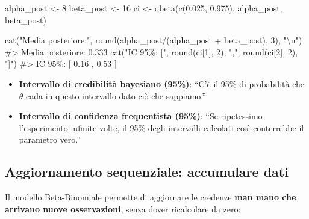 \documentclass[
  letterpaper,
  DIV=11,
  numbers=noendperiod,
  oneside]{scrreprt}
\newenvironment{Shaded}{\begin{snugshade}}{\end{snugshade}}
\newcommand{\CommentTok}[1]{\textcolor[rgb]{0.37,0.37,0.37}{#1}}
\newcommand{\DecValTok}[1]{\textcolor[rgb]{0.68,0.00,0.00}{#1}}
\newcommand{\FloatTok}[1]{\textcolor[rgb]{0.68,0.00,0.00}{#1}}
\newcommand{\FunctionTok}[1]{\textcolor[rgb]{0.28,0.35,0.67}{#1}}
\newcommand{\NormalTok}[1]{\textcolor[rgb]{0.00,0.23,0.31}{#1}}
\newcommand{\OtherTok}[1]{\textcolor[rgb]{0.00,0.23,0.31}{#1}}
\newcommand{\SpecialCharTok}[1]{\textcolor[rgb]{0.37,0.37,0.37}{#1}}
\newcommand{\StringTok}[1]{\textcolor[rgb]{0.13,0.47,0.30}{#1}}
\providecommand{\tightlist}{%
  \setlength{\itemsep}{0pt}\setlength{\parskip}{0pt}}
\theoremstyle{definition}
\theoremstyle{plain}
\theoremstyle{definition}
\theoremstyle{remark}
\begin{document}
\begin{Shaded}
\begin{Highlighting}[]
\NormalTok{alpha\_post }\OtherTok{\textless{}{-}} \DecValTok{8}
\NormalTok{beta\_post }\OtherTok{\textless{}{-}} \DecValTok{16}
\NormalTok{ci }\OtherTok{\textless{}{-}} \FunctionTok{qbeta}\NormalTok{(}\FunctionTok{c}\NormalTok{(}\FloatTok{0.025}\NormalTok{, }\FloatTok{0.975}\NormalTok{), alpha\_post, beta\_post)}

\FunctionTok{cat}\NormalTok{(}\StringTok{"Media posteriore:"}\NormalTok{, }\FunctionTok{round}\NormalTok{(alpha\_post}\SpecialCharTok{/}\NormalTok{(alpha\_post }\SpecialCharTok{+}\NormalTok{ beta\_post), }\DecValTok{3}\NormalTok{), }\StringTok{"}\SpecialCharTok{\textbackslash{}n}\StringTok{"}\NormalTok{)}
\CommentTok{\#\textgreater{} Media posteriore: 0.333}
\FunctionTok{cat}\NormalTok{(}\StringTok{"IC 95\%: ["}\NormalTok{, }\FunctionTok{round}\NormalTok{(ci[}\DecValTok{1}\NormalTok{], }\DecValTok{2}\NormalTok{), }\StringTok{","}\NormalTok{, }\FunctionTok{round}\NormalTok{(ci[}\DecValTok{2}\NormalTok{], }\DecValTok{2}\NormalTok{), }\StringTok{"]"}\NormalTok{)}
\CommentTok{\#\textgreater{} IC 95\%: [ 0.16 , 0.53 ]}
\end{Highlighting}
\end{Shaded}

\begin{itemize}
\tightlist
\item
  \textbf{Intervallo di credibilità bayesiano (95\%)}: ``C'è il 95\% di
  probabilità che \(\theta\) cada in questo intervallo dato ciò che
  sappiamo.''
\item
  \textbf{Intervallo di confidenza frequentista (95\%)}: ``Se
  ripetessimo l'esperimento infinite volte, il 95\% degli intervalli
  calcolati così conterrebbe il parametro vero.''
\end{itemize}

\subsection{Aggiornamento sequenziale: accumulare
dati}\label{aggiornamento-sequenziale-accumulare-dati}

Il modello Beta-Binomiale permette di aggiornare le credenze \textbf{man
mano che arrivano nuove osservazioni}, senza dover ricalcolare da zero:
\end{document}
